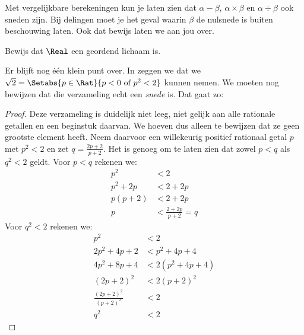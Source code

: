 \documentclass[../../../include/open-logic-section]{subfiles}
\begin{document}
Met vergelijkbare berekeningen kun je laten zien dat $\alpha - \beta$,
$\alpha \times \beta$ en $\alpha \div \beta$ ook sneden zijn. Bij
delingen moet je het geval waarin $\beta$ de nulsnede is buiten
beschouwing laten. Ook dat bewijs laten we aan jou over.
\begin{prob}
Bewijs dat $\Real$ een geordend lichaam is.
\end{prob}
Er blijft nog één klein punt over. In  zeggen we dat
we $\sqrt{2} = \Setabs{p \in \Rat}{p < 0 \text{ of }p^2 < 2}$ kunnen nemen.
We moeten nog bewijzen dat die verzameling echt een \emph{snede} is.
Dat gaat zo:
\begin{proof}
Deze verzameling is duidelijk niet leeg, niet gelijk aan alle
rationale getallen en een beginstuk daarvan. We hoeven dus alleen te
bewijzen dat ze geen grootste element heeft. Neem daarvoor een
willekeurig positief rationaal getal $p$ met $p^2 < 2$ en zet $q =
\frac{2p+2}{p+2}$. Het is genoeg om te laten zien dat zowel $p < q$
als $q^2 < 2$ geldt. Voor $p < q$ rekenen we:
\begin{align*}
	p^2 &< 2\\
	p^2 + 2p &< 2 + 2p\\
	p(p + 2) &< 2 + 2p\\
	p &< \tfrac{2+2p}{p+2} = q
\end{align*}
Voor $q^2 < 2$ rekenen we:
\begin{align*}
	p^2 &< 2\\
	2p^2 + 4p + 2 &< p^2 + 4p+ 4\\
	4p^2 + 8p + 4 &< 2(p^2 + 4p + 4)\\
	(2p+2)^2 & <2(p+2)^2\\
	\tfrac{(2p+2)^2}{(p+2)^2} &< 2\\
	q^2 &< 2
\end{align*}
\end{proof}
\end{document}
